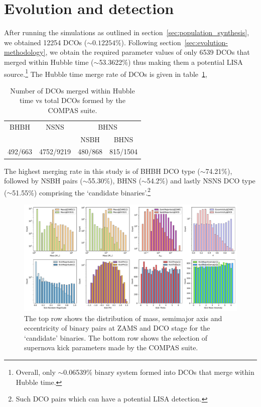 \documentclass[journal, twocolumn]{IEEEtran}
\begin{document}
    \section{Evolution and detection}
    \label{sec:evolution-and-detection}

    After running the simulations as outlined in section~\ref{sec:population_synthesis}, we obtained 12254 DCOs ($\sim0.12254\%$).
    Following section~\ref{sec:evolution-methodology}, we obtain the required parameter values of only 6539 DCOs that merged within Hubble time ($\sim$53.3622\%) thus making them a potential LISA source.\footnote{Overall, only $\sim$0.06539\% binary system formed into DCOs that merge within Hubble time.}
    The Hubble time merge rate of DCOs is given in table~\ref{tab:dco_details},

    \begin{table}[!ht]
        \centering
        \begin{tabular}{@{}cccc@{}}
            \toprule
            \multirow{2.5}{*}{BHBH} & \multirow{2.5}{*}{NSNS} & \multicolumn{2}{c}{BHNS} \\ \cmidrule(l){3-4}
            &           & NSBH    & BHNS     \\ \midrule
            492/663 & 4752/9219 & 480/868 & 815/1504 \\ \bottomrule
        \end{tabular}%
        \caption{Number of DCOs merged within Hubble time vs total DCOs formed by the COMPAS suite.}
        \label{tab:dco_details}
    \end{table}

    The highest merging rate in this study is of BHBH DCO type ($\sim$74.21\%), followed by NSBH pairs ($\sim$55.30\%), BHNS ($\sim$54.2\%) and lastly NSNS DCO type ($\sim$51.55\%) comprising the `candidate binaries'.\footnote{Such DCO pairs which can have a potential LISA detection.}

    \begin{figure}[!h]%
        \centering
        \includegraphics[width=\textwidth]{analysis_data/main_analysis_folder/all_zams_params}
        \caption{The top row shows the distribution of mass, semimajor axis and eccentricity of binary pairs at ZAMS and DCO stage for the `candidate' binaries. The bottom row shows the selection of supernova kick parameters made by the COMPAS suite.}
        \label{fig:all_zams_params}
    \end{figure}%
\end{document}
